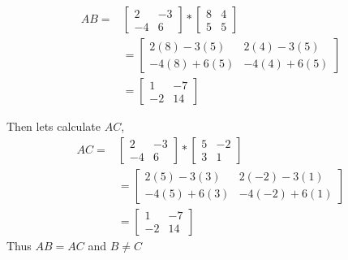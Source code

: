 \documentclass{amsart}
\begin{document}
\begin{align}
AB
=&
\begin{bmatrix}
2&-3\\
-4&6
\end{bmatrix}
*
\begin{bmatrix}
8&4\\
5&5
\end{bmatrix}\\ 
&=
\begin{bmatrix}
2(8)-3(5)&2(4)-3(5)\\
-4(8)+6(5)&-4(4)+6(5)
\end{bmatrix}\\ 
&=
\begin{bmatrix}
1&-7\\
-2&14
\end{bmatrix}
\end{align}

Then lets calculate $AC$,
\begin{align}
AC
=&
\begin{bmatrix}
2&-3\\
-4&6
\end{bmatrix}
*
\begin{bmatrix}
5&-2\\
3&1
\end{bmatrix}\\ 
&=
\begin{bmatrix}
2(5)-3(3)&2(-2)-3(1)\\
-4(5)+6(3)&-4(-2)+6(1)
\end{bmatrix}\\ 
&=
\begin{bmatrix}
1&-7\\
-2&14
\end{bmatrix}
\end{align}
Thus $AB=AC$ and $B \neq C$
\vspace{1in}
\end{document}
